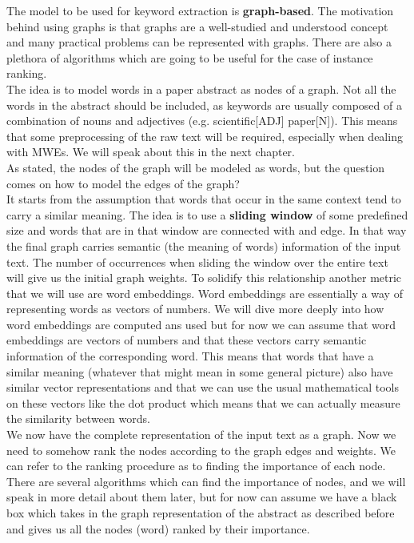 \documentclass[12pt]{article}
\numberwithin{equation}{section}
\begin{document}
\begin{spacing}{1.5}
	The model to be used for keyword extraction is \textbf{graph-based}. The motivation behind using graphs is that graphs are a well-studied and understood concept and many practical problems can be represented with graphs. There are also a plethora of algorithms which are going to be useful for the case of instance ranking. \\
	The idea is to model words in a paper abstract as nodes of a graph. Not all the words in the abstract should be included, as keywords are usually composed of a combination of nouns and adjectives (e.g. scientific[ADJ] paper[N]). This means that some preprocessing of the raw text will be required, especially when dealing with MWEs. We will speak about this in the next chapter. \\
	As stated, the nodes of the graph will be modeled as words, but the question comes on how to model the edges of the graph? \\
	It starts from the assumption that words that occur in the same context tend to carry a similar meaning. The idea is to use a \textbf{sliding window} of some predefined size and words that are in that window are connected with and edge. In that way the final graph carries semantic (the meaning of words) information of the input text. The number of occurrences when sliding the window over the entire text will give us the initial graph weights. To solidify this relationship another metric that we will use are word embeddings. Word embeddings are essentially a way of representing words as vectors of numbers. We will dive more deeply into how word embeddings are computed ans used but for now we can assume that word embeddings are vectors of numbers and that these vectors carry semantic information of the corresponding word. This means that words that have a similar meaning (whatever that might mean in some general picture) also have similar vector representations and that we can use the usual mathematical tools on these vectors like the dot product which means that we can actually measure the similarity between words. \\
	We now have the complete representation of the input text as a graph. Now we need to somehow rank the nodes according to the graph edges and weights. We can refer to the ranking procedure as to finding the importance of each node. There are several algorithms which can find the importance of nodes, and we will speak in more detail about them later, but for now can assume we have a black box which takes in the graph representation of the abstract as described before and gives us all the nodes (word) ranked by their importance. \\

\end{spacing}
\end{document}
